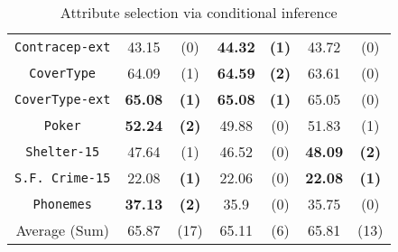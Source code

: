 \begin{table*}
\begin{subtable}{.6\linewidth}
\begin{tabular}{c|cc|cc|cc}
{\tt Contracep-ext} &  43.15       & (0)          &  {\bf 44.32} & {\bf (1)}    &  43.72       & (0)                \\
{\tt CoverType}     &  64.09       & (1)          &  {\bf 64.59} & {\bf (2)}    &  63.61       & (0)                \\
{\tt CoverType-ext} &  {\bf 65.08} & {\bf (1)}    &  {\bf 65.08} & {\bf (1)}    &  65.05       & (0)                \\
{\tt Poker}         &  {\bf 52.24} & {\bf (2)}    &  49.88       & (0)          &  51.83       & (1)                \\ 
{\tt Shelter-15}    &  47.64       & (1)          &  46.52       & (0)          & {\bf 48.09}  & {\bf (2)}          \\ 
{\tt S.F. Crime-15} &  22.08       & {\bf (1)}    &  22.06       & (0)          & {\bf 22.08}  & {\bf (1)}          \\   
{\tt Phonemes}      &  {\bf 37.13} & {\bf (2)}    &  35.9        & (0)          & 35.75        & (0)                \\  \hline
Average (Sum)       &  65.87       &  (17)        &  65.11       & (6)          & 65.81        & (13)    
 

\end{tabular}
    \end{subtable}
    \begin{subtable}{.4\linewidth}
      \centering
        \caption{Attribute selection via conditional inference}


\end{subtable}
\end{table*}
